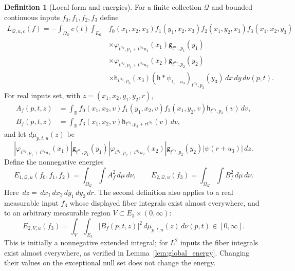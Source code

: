 \documentclass[12pt,reqno]{amsart}
\theoremstyle{plain}
\theoremstyle{definition}
\newtheorem{definition}[theorem]{Definition}
\theoremstyle{remark}
\numberwithin{equation}{section}
\newcommand{\R}{\mathbb R}
\newcommand{\g}{\mathsf g}
\newcommand{\h}{\mathsf h}
\newcommand{\dd}{\,d}
\begin{document}
\begin{definition}[Local form and energies]\label{def:local_model}
For a finite collection $\mathcal Q$ and bounded continuous inputs
$f_0,f_1,f_2,f_3$ define
\begin{align*}
 L_{\mathcal Q,u,c}(f)=-\int_{\Omega_{\mathcal Q}}c(t)\int_{E_6}
 &f_0(x_1,x_2,x_3)f_1(y_1,x_2,x_3)
 f_2(x_1,y_2,x_3)f_3(x_1,x_2,y_3)\\
 &\times\varphi_{t^{\alpha_1},p_1+t^{\alpha_1}u_1}(x_1)
                 \g_{t^{\alpha_1},p_1}(y_1)\\
 &\times\varphi_{t^{\alpha_2},p_2+t^{\alpha_2}u_2}(x_2)
                 \g_{t^{\alpha_2},p_2}(y_2)\\
 &\times\h_{t^{\alpha_3},p_3}(x_3)
       (\h*\psi_{1,-u_3})_{t^{\alpha_3},p_3}(y_3)
                  \dd x\dd y\,d\nu(p,t).
\end{align*}
For real inputs set, with $z=(x_1,x_2,y_1,y_2,r)$,
\begin{align*}
 A_f(p,t,z)&=\int_\R f_0(x_1,x_2,v)f_1(y_1,x_2,v)f_2(x_1,y_2,v)
                        \h_{t^{\alpha_3},p_3}(v)\dd v,\\
 B_f(p,t,z)&=\int_\R f_3(x_1,x_2,v)
                        \h_{t^{\alpha_3},p_3+rt^{\alpha_3}}(v)\dd v,
\end{align*}
and let $d\mu_{p,t,u}(z)$ be
\[
 |\varphi_{t^{\alpha_1},p_1+t^{\alpha_1}u_1}(x_1)|\g_{t^{\alpha_1},p_1}(y_1)
 |\varphi_{t^{\alpha_2},p_2+t^{\alpha_2}u_2}(x_2)|\g_{t^{\alpha_2},p_2}(y_2)
 |\psi(r+u_3)|\dd z.
\]
Define the nonnegative energies
\[
 E_{1,\mathcal Q,u}(f_0,f_1,f_2)=\int_{\Omega_{\mathcal Q}}\int A_f^2\dd\mu\,d\nu,
 \qquad
 E_{2,\mathcal Q,u}(f_3)=\int_{\Omega_{\mathcal Q}}\int B_f^2\dd\mu\,d\nu.
\]
Here $\dd z=\dd x_1\dd x_2\dd y_1\dd y_2\dd r$.
The second definition also applies to a real measurable input $f_3$
whose displayed fiber integrals exist almost everywhere, and to an
arbitrary measurable region $V\subset E_3\times(0,\infty)$:
\[
 E_{2,V,u}(f_3)=\int_V\int_{E_5}|B_f(p,t,z)|^2
                         \dd\mu_{p,t,u}(z)\,d\nu(p,t)\in[0,\infty].
\]
This is initially a nonnegative extended integral; for $L^2$ inputs
the fiber integrals exist almost everywhere, as verified in
Lemma~\ref{lem:global_energy}. Changing their values on the exceptional
null set does not change the energy.
\end{definition}
\end{document}
